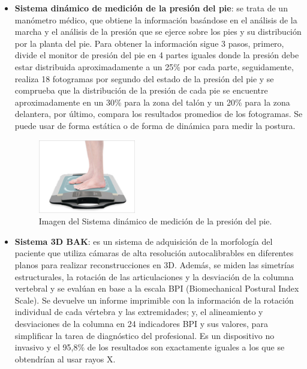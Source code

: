 \begin{itemize}
    \item \textbf{Sistema dinámico de medición de la presión del pie}\cite{SisDinPresionPie}: se trata de un manómetro médico, que obtiene la información basándose en el análisis de la marcha y el análisis de la presión que se ejerce sobre los pies y su distribución por la planta del pie. Para obtener la información sigue 3 pasos, primero, divide el monitor de presión del pie en 4 partes iguales donde la presión debe estar distribuida aproximadamente a un 25\% por cada parte, seguidamente, realiza 18 fotogramas por segundo del estado de la presión del pie y se comprueba que la distribución de la presión de cada pie se encuentre aproximadamente en un 30\% para la zona del talón y un 20\% para la zona delantera, por último, compara los resultados promedios de los fotogramas. Se puede usar de forma estática o de forma de dinámica para medir la postura. 
\begin{figure}[h!]
    \centering
    \includegraphics[width=0.4\textwidth]{img/imgSisDin.jpg}
    \caption{Imagen del Sistema dinámico de medición de la presión del pie. \cite{SisDinPresionPie}}
    \label{fig:imgSisDin} 
\end{figure}
    \item \textbf{Sistema 3D BAK}\cite{3DBAK}: es un sistema de adquisición de la morfología del paciente que utiliza cámaras de alta resolución autocalibrables en diferentes planos para realizar reconstrucciones en 3D. Además, se miden las simetrías estructurales, la rotación de las articulaciones y la desviación de la columna vertebral y se evalúan en base a la escala BPI (Biomechanical Postural Index Scale). Se devuelve un informe imprimible con la información de la rotación individual de cada vértebra y las extremidades; y, el alineamiento y desviaciones de la columna en 24 indicadores BPI y sus valores, para simplificar la tarea de diagnóstico del profesional. Es un dispositivo no invasivo y el 95,8\% de los resultados son exactamente iguales a los que se obtendrían al usar rayos X. 


\end{itemize}
